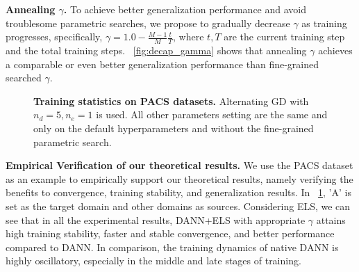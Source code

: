 \documentclass{article} \usepackage{iclr2023_conference,times}
\newcommand{\abbr}[0]{DANN+ELS\xspace}
\newcommand{\ls}[0]{ELS\xspace}
\begin{document}
\textbf{Annealing $\gamma$.} To achieve better generalization performance and avoid troublesome parametric searches, we propose to gradually decrease $\gamma$ as training progresses, specifically, $\gamma=1.0-\frac{M-1}{M}\frac{t}{T}$, where $t,T$ are the current training step and the total training steps. \figurename~\ref{fig:decap_gamma} shows that annealing $\gamma$ achieves a comparable or even better generalization performance than fine-grained searched $\gamma$.

\begin{figure}[h]
\centering


\centering
\caption{\textbf{Training statistics on PACS datasets.} Alternating GD with $n_d=5,n_e=1$ is used. All other parameters setting are the same and only on the default hyperparameters
and without the fine-grained parametric search.} \label{fig:pacs_training}
\vspace{-0.2cm}
\end{figure}
\vspace{-0.2cm}
\textbf{Empirical Verification of our theoretical results.} We use the PACS dataset as an example to empirically support our theoretical results, namely verifying the benefits to convergence, training stability, and generalization results. In \figurename~\ref{fig:pacs_training}, 'A' is set as the target domain and other domains as sources. Considering \ls, we can see that in all the experimental results, \abbr with appropriate $\gamma$ attains high training stability, faster and stable convergence, and better performance compared to DANN. In comparison, the training dynamics of native DANN is highly oscillatory, especially in the middle and late stages of training.



\vspace{-2mm}
\end{document}
